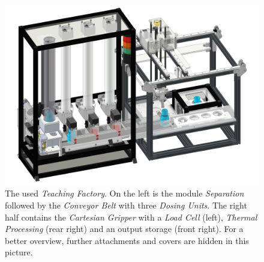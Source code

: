 
	\begin{figure}[htp]
		\centering
		\includegraphics[trim=20mm 0mm 20mm 0mm, clip, width=0.8\linewidth]{figures/TeachingFactory_Real.pdf}
		\caption[The used \textit{Teaching Factory}.]{The used \textit{Teaching Factory}. On the left is the module \textit{Separation} followed by the \textit{Conveyor Belt} with three \textit{Dosing Units}. The right half contains the \textit{Cartesian Gripper} with a \textit{Load Cell} (left), \textit{Thermal Processing} (rear right) and an output storage (front right). For a better overview, further attachments and covers are hidden in this picture.}
		\label{fig:TeachingFactory}
	\end{figure}
	
	

	
